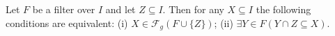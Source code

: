 Let $F$ be a filter over $I$ and let $Z \subseteq I$. Then for any $X \subseteq I$ the following conditions are equivalent:
(i) $X \in \mathcal{F}_g(F \cup \{Z\})$;
(ii) $\exists Y \in F(Y \cap Z \subseteq X)$.
